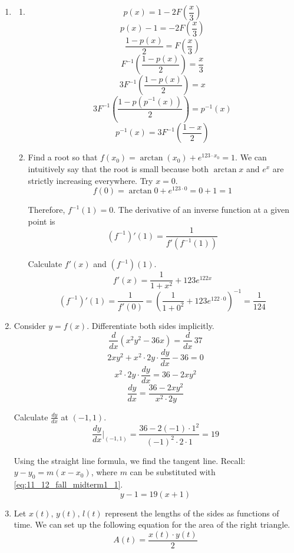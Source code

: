 \documentclass[a4paper, 12pt]{article}
\begin{document}
\begin{enumerate}[leftmargin=*,label=\textbf{\arabic*.}]
If $\ln(L)=0$, then $\boxed{L=1}$.

\item
\begin{enumerate}[leftmargin=*,label=\textbf{\alph*.}]
\item\leavevmode

\vspace{-2.5em}
\[p(x)=1-2F\left(\frac x3\right)\]
\[p(x)-1=-2F\left(\frac x3\right)\]
\[\frac{1-p(x)}{2}=F\left(\frac x3\right)\]
\[F^{-1}\left(\frac{1-p(x)}{2}\right)=\frac x3\]
\[3F^{-1}\left(\frac{1-p(x)}{2}\right)=x\]
\[3F^{-1}\left(\frac{1-p\left(p^{-1}(x)\right)}{2}\right)=p^{-1}(x)\]
\[\boxed{p^{-1}(x)=3F^{-1}\left(\frac{1-x}{2}\right)}\]

\item Find a root so that $f(x_0) = \arctan(x_0)+ e^{123\cdot x_0} = 1$. We can intuitively say that the root is small because both $\arctan x$ and $ e^x$ are strictly increasing everywhere. Try $x=0$.
\[f(0)=\arctan 0+ e^{123\cdot 0}=0+1=1\]

Therefore, $f^{-1}(1)=0$. The derivative of an inverse function at a given point is
\[\left(f^{-1}\right)'(1)=\frac1{f'(f^{-1}(1))}\]

Calculate $f'(x)$ and $(f^{-1})(1)$.
\[f'(x)=\frac1{1+x^2}+123 e^{122x}\]
\[\left(f^{-1}\right)'(1)=\frac{1}{f'(0)}=\left( \frac1{1+0^2}+123 e^{122\cdot0} \right)^{-1}=\boxed{\frac1{124}}\]
\end{enumerate}

\item Consider $y=f(x)$. Differentiate both sides implicitly.
\[\frac{d}{dx}\left(x^2y^2-36x\right) = \frac{d}{dx}\,37\]
\[2xy^2+ x^2\cdot2y\cdot \frac{dy}{dx}-36 = 0\]
\[x^2\cdot2y\cdot \frac{dy}{dx}=36 - 2xy^2\]
\[\frac{dy}{dx}=\frac{36-2xy^2}{x^2\cdot2y}\]

Calculate $\displaystyle \frac{dy}{dx}$ at $(-1,1)$.
\begin{equation}\frac{dy}{dx}\Bigg|_{(-1,1)}=\frac{36-2(-1)\cdot1^2}{(-1)^2\cdot2\cdot1} = 19\label{eq:11_12_fall_midterm1_1}\end{equation}

Using the straight line formula, we find the tangent line. Recall: $y-y_0=m(x-x_0)$, where $m$ can be substituted with \eqref{eq:11_12_fall_midterm1_1}.
\[\boxed{y-1=19(x+1)}\]

\item Let $x(t),\,y(t),\,l(t)$ represent the lengths of the sides as functions of time. We can set up the following equation for the area of the right triangle.
\[A(t) = \frac{x(t)\cdot y(t)}{2}\]


\end{enumerate}
\end{document}
